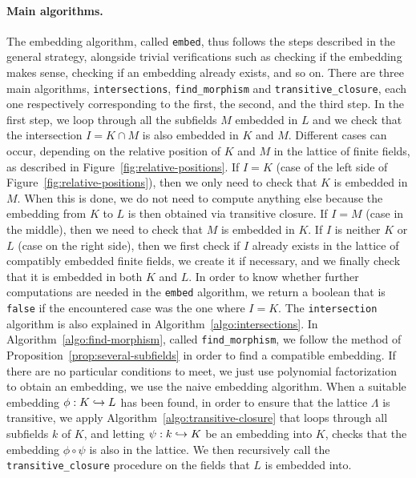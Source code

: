 \paragraph{Main algorithms.} The embedding algorithm, called \texttt{embed}, thus follows the steps
described in the general strategy, alongside trivial verifications such as
checking if the embedding makes sense, checking if an embedding already exists,
and so on. There are three main algorithms, \texttt{intersections},
\texttt{find\_morphism} and \texttt{transitive\_closure}, each one respectively
corresponding to the first, the second, and the third step. In the first step,
we loop through all the subfields $M$ embedded in $L$ and we check that the
intersection $I = K\cap M$ is also embedded in $K$ and $M$. Different cases can
occur, depending on the relative position of $K$ and $M$ in the lattice of
finite fields, as described in Figure~\ref{fig:relative-positions}. If $I=K$
(case of the left side of Figure~\ref{fig:relative-positions}), then we only
need to check that $K$ is embedded in $M$. When
this is done, we do not need to compute anything else because the embedding from
$K$ to $L$ is then obtained via transitive closure. If $I=M$ (case in the
middle), then we need to check that $M$ is embedded in $K$. If $I$ is neither
$K$ or $L$ (case on the right side), then we first check if $I$ already exists
in the lattice of compatibly embedded finite fields, we create it if necessary,
and we finally check that it is embedded in both $K$ and $L$. In order
to know whether further computations are needed in the \texttt{embed}
algorithm, we return a boolean that is \texttt{false} if the encountered case
was the one where $I=K$. The \texttt{intersection} algorithm is also explained
in Algorithm~\ref{algo:intersections}. In Algorithm~\ref{algo:find-morphism},
called \texttt{find\_morphism}, we follow the method of
Proposition~\ref{prop:several-subfields} in order to find a compatible
embedding. If there are no particular conditions to meet, we just use polynomial
factorization to obtain an embedding, \ie we use the naive embedding algorithm.
When a suitable embedding $\phi:K\hookrightarrow L$ has been found, in order to ensure that
the lattice $\Lambda$ is transitive, we apply
Algorithm~\ref{algo:transitive-closure} that loops through all subfields $k$ of
$K$, and letting $\psi:k\hookrightarrow K$ be an embedding into $K$, checks that the
embedding $\phi\circ\psi$ is
also in the lattice. We then recursively call the \texttt{transitive\_closure}
procedure on the fields that $L$ is embedded into.
